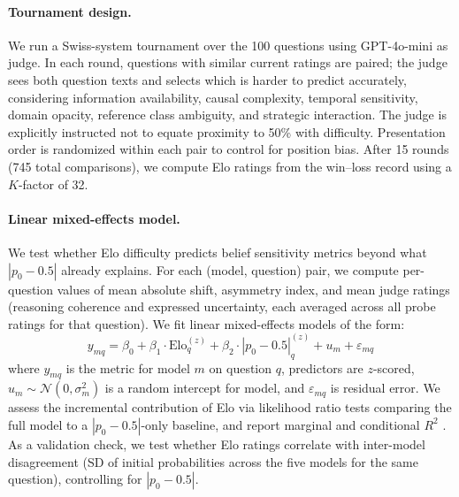 \documentclass[11pt]{article}
\begin{document}
\paragraph{Tournament design.}
We run a Swiss-system tournament over the 100 questions using GPT-4o-mini as judge.
In each round, questions with similar current ratings are paired; the judge sees both question texts and selects which is harder to predict accurately, considering information availability, causal complexity, temporal sensitivity, domain opacity, reference class ambiguity, and strategic interaction.
The judge is explicitly instructed not to equate proximity to 50\% with difficulty.
Presentation order is randomized within each pair to control for position bias.
After 15 rounds (745 total comparisons), we compute Elo ratings from the win--loss record using a $K$-factor of 32.

\paragraph{Linear mixed-effects model.}
We test whether Elo difficulty predicts belief sensitivity metrics beyond what $|p_0 - 0.5|$ already explains.
For each (model, question) pair, we compute per-question values of mean absolute shift, asymmetry index, and mean judge ratings (reasoning coherence and expressed uncertainty, each averaged across all probe ratings for that question).
We fit linear mixed-effects models of the form:
\begin{equation}
    y_{mq} = \beta_0 + \beta_1 \cdot \text{Elo}_q^{(z)} + \beta_2 \cdot |p_0 - 0.5|_q^{(z)} + u_m + \varepsilon_{mq}
\end{equation}
where $y_{mq}$ is the metric for model $m$ on question $q$, predictors are $z$-scored, $u_m \sim \mathcal{N}(0, \sigma_m^2)$ is a random intercept for model, and $\varepsilon_{mq}$ is residual error.
We assess the incremental contribution of Elo via likelihood ratio tests comparing the full model to a $|p_0 - 0.5|$-only baseline, and report marginal and conditional $R^2$ \cite{nakagawa2013general}.
As a validation check, we test whether Elo ratings correlate with inter-model disagreement (SD of initial probabilities across the five models for the same question), controlling for $|p_0 - 0.5|$.

%



\end{document}
